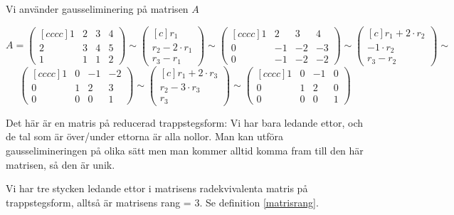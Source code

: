 \documentclass[../../main.tex]{subfiles}
\begin{document}
\begin{solution}{13}

Vi använder gausseliminering på matrisen $A$

$$
A = \begin{pmatrix}[cccc]
1 & 2 & 3 & 4\\
2 & 3 & 4 & 5\\
1 & 1 & 1 & 2
\end{pmatrix}
\sim 
\begin{pmatrix}[c]
r_1\\
r_2 - 2\cdot r_1\\
r_3 - r_1
\end{pmatrix}
\sim 
\begin{pmatrix}[cccc]
1 & 2 & 3 & 4\\
0 & -1 & -2 & -3\\
0 & -1 & -2 & -2
\end{pmatrix}
\sim 
\begin{pmatrix}[c]
r_1 + 2\cdot r_2\\
-1\cdot r_2\\
r_3 - r_2
\end{pmatrix}
\sim
$$
$$
\begin{pmatrix}[cccc]
1 & 0 & -1 & -2\\
0 & 1 & 2 & 3\\
0 & 0 & 0 & 1
\end{pmatrix}
\sim 
\begin{pmatrix}[c]
r_1 + 2\cdot r_3\\
r_2 - 3\cdot r_3\\
r_3
\end{pmatrix}
\sim
\begin{pmatrix}[cccc]
1 & 0 & -1 & 0\\
0 & 1 & 2 & 0\\
0 & 0 & 0 & 1
\end{pmatrix}
$$

Det här är en matris på reducerad trappstegsform: Vi har bara ledande ettor, och de tal som är över/under ettorna är alla nollor. Man kan utföra gausselimineringen på olika sätt men man kommer alltid komma fram till den här matrisen, så den är unik. 

Vi har tre stycken ledande ettor i matrisens radekvivalenta matris på trappstegsform, alltså är matrisens rang = 3. Se definition \ref{matrisrang}.

\end{solution}
\end{document}

